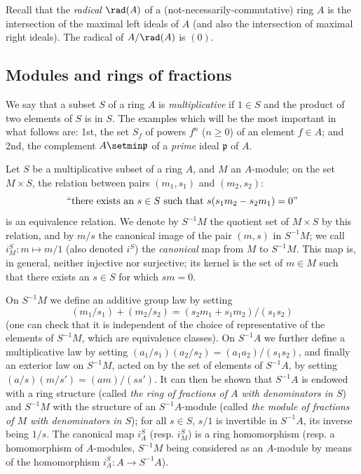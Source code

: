 \begin{env}[1.1.2]
\label{0.1.1.2}
Recall that the \emph{radical} $\rad(A)$ of a (not-necessarily-commutative) ring $A$ is the intersection of the maximal left ideals of $A$ (and also the intersection of maximal right ideals).
The radical of $A/\rad(A)$ is $(0)$.
\end{env}

\subsection{Modules and rings of fractions}
\label{subsection:0.1.2}

\begin{env}[1.2.1]
\label{0.1.2.1}
We say that a subset $S$ of a ring $A$ is \emph{multiplicative} if $1\in S$ and the product of two elements of $S$ is in $S$.
The examples which will be the most important in what follows are: 1st, the set $S_f$ of powers $f^n$ ($n\geq 0$) of an element $f\in A$; and 2nd, the complement $A\setmin\mathfrak{p}$ of a \emph{prime} ideal $\mathfrak{p}$ of $A$.
\end{env}

\begin{env}[1.2.2]
\label{0.1.2.2}
Let $S$ be a multiplicative subset of a ring $A$, and $M$ an $A$-module; on the set
$M\times S$, the relation between pairs $(m_1,s_1)$ and $(m_2,s_2)$:
\[
  ``\text{there exists an }s\in S\text{ such that }s(s_1 m_2-s_2 m_1)=0\text{''}
\]
is an equivalence relation. We denote by $S^{-1}M$ the quotient set of
$M\times S$ by this relation, and by $m/s$ the canonical image of the pair $(m,s)$ in $S^{-1}M$; we call $i_M^S:m\mapsto m/1$ (also denoted $i^S$) the
\emph{canonical} map from $M$ to $S^{-1}M$. This map is, in general, neither
injective nor surjective; its kernel is the set of $m\in M$ such that there
exists an $s\in S$ for which $sm=0$.

On $S^{-1}M$ we define an additive group law by setting
\[
  (m_1/s_1)+(m_2/s_2)=(s_2 m_1+s_1 m_2)/(s_1 s_2)
\]
(one can check that it is independent of the choice of representative of the elements of $S^{-1}M$, which are equivalence classes).
On $S^{-1}A$ we further define a multiplicative law by setting
$(a_1/s_1)(a_2/s_2)=(a_1 a_2)/(s_1 s_2)$, and finally an exterior law on
$S^{-1}M$, acted on by the set of elements of $S^{-1}A$, by setting
$(a/s)(m/s')=(am)/(ss')$.
It can then be shown that $S^{-1}A$ is endowed with a
ring structure (called \emph{the ring of fractions of $A$ with denominators in
$S$}) and $S^{-1}M$ with the structure of an $S^{-1}A$-module (called \emph{the
module of fractions of $M$ with denominators in $S$}); for all $s\in S$, $s/1$
is invertible in $S^{-1}A$, its inverse being $1/s$.
The canonical map $i_A^S$ (resp. $i_M^S$) is a ring homomorphism (resp. a homomorphism of $A$-modules,
$S^{-1}M$ being considered as an $A$-module by means of the homomorphism
$i_A^S:A\to S^{-1}A$).
\end{env}

